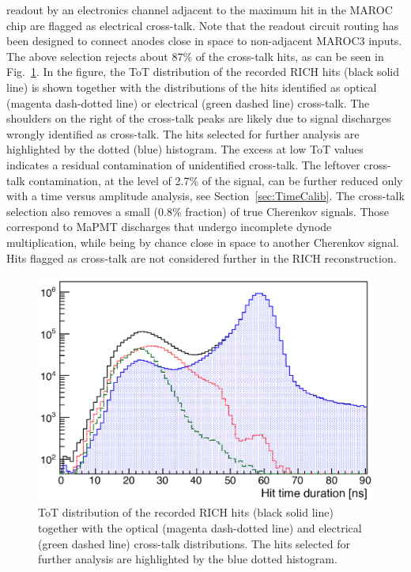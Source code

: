 \documentclass[5p,times,twocolumn]{elsarticle}
\begin{document}
readout by an electronics channel adjacent to the maximum hit in the MAROC chip are flagged as electrical
cross-talk. Note that the readout circuit routing has been designed to connect anodes close in space to non-adjacent
MAROC3 inputs. The above selection rejects about 87\% of the cross-talk hits, as can be seen in Fig.~\ref{Fig:Xtalk}.
In the figure, the ToT distribution of the recorded RICH hits (black solid line) is shown together with the
distributions of the hits identified as optical (magenta dash-dotted line) or electrical (green dashed line) cross-talk. The
shoulders on the right of the cross-talk peaks are likely due to signal discharges wrongly identified as cross-talk.
The hits selected for further analysis are highlighted by the dotted (blue) histogram. The excess at low ToT values
indicates a residual contamination of unidentified cross-talk. The leftover cross-talk contamination, at the level of
2.7\% of the signal, can be further reduced only with a time versus amplitude analysis, see Section~\ref{sec:TimeCalib}.
The cross-talk selection also removes a small (0.8\% fraction) of true Cherenkov signals. Those correspond to MaPMT
discharges that undergo incomplete dynode multiplication, while being by chance close in space to another Cherenkov signal.
Hits flagged as cross-talk are not considered further in the RICH reconstruction.

\begin{figure}[t]
\begin{center}
\includegraphics[width=1.0\columnwidth]{xtalk.png}
\end{center}
\caption{ToT distribution of the recorded RICH hits (black solid line) together with the optical (magenta dash-dotted line)
  and electrical (green dashed line) cross-talk distributions.  The hits selected for further analysis are highlighted by the
  blue dotted histogram. }
\label{Fig:Xtalk}
\end{figure}
\end{document}
